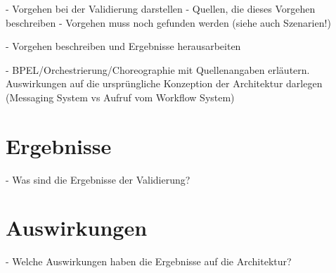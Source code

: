   - Vorgehen bei der Validierung darstellen
  - Quellen, die dieses Vorgehen beschreiben
  - Vorgehen muss noch gefunden werden (siehe auch Szenarien!)
  
  - Vorgehen beschreiben und Ergebnisse herausarbeiten

  - BPEL/Orchestrierung/Choreographie mit Quellenangaben erläutern. Auswirkungen auf die ursprüngliche Konzeption der Architektur darlegen (Messaging System vs Aufruf vom Workflow System)


\section{Ergebnisse} %
\label{sec:ergebnisse}

  - Was sind die Ergebnisse der Validierung?


\section{Auswirkungen} %
\label{sec:auswirkungen}

  - Welche Auswirkungen haben die Ergebnisse auf die Architektur?



